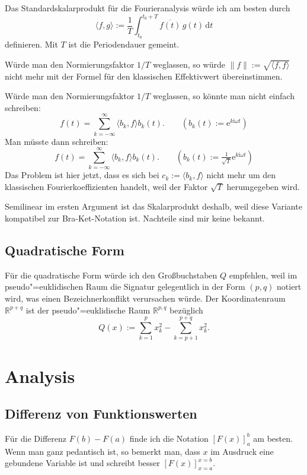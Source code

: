 \documentclass[a4paper,11pt,fleqn,twoside,BCOR=16mm]{scrartcl}
\newcommand{\R}{\mathbb R}
\newcommand{\ee}{\mathrm e}
\newcommand{\ui}{\mathrm i}
\begin{document}
Das Standardskalarprodukt für die Fourieranalysis würde ich
am besten durch
\begin{equation}\label{eq:FourierSP}
\langle f,g\rangle := \frac{1}{T}\int_{t_0}^{t_0+T}
\overline{f(t)}\,g(t)\,\mathrm dt
\end{equation}
definieren. Mit $T$ ist die Periodendauer gemeint.

Würde man den Normierungsfaktor $1/T$ weglassen, so würde
$\|f\|:=\sqrt{\langle f,f\rangle}$ nicht mehr mit der Formel
für den klassischen Effektivwert übereinstimmen.

Würde man den Normierungsfaktor $1/T$ weglassen, so könnte man
nicht einfach schreiben:
\begin{equation}
f(t) = \sum_{k=-\infty}^\infty \langle b_k,f\rangle b_k(t).
\qquad (b_k(t):=\ee^{k\ui \omega t})
\end{equation}
Man müsste dann schreiben:
\begin{equation}
f(t) = \sum_{k=-\infty}^{\infty} \langle b_k,f\rangle b_k(t).
\qquad(b_k(t):=\tfrac{1}{\sqrt{T}}\ee^{k\ui \omega t})
\end{equation}
Das Problem ist hier jetzt, dass es sich bei $c_k:=\langle b_k,f\rangle$
nicht mehr um den klassischen Fourierkoeffizienten handelt, weil
der Faktor $\sqrt{T}$ herumgegeben wird.

Semilinear im ersten Argument ist das Skalarprodukt deshalb, weil
diese Variante kompatibel zur Bra-Ket-Notation ist. Nachteile sind
mir keine bekannt.

\subsection{Quadratische Form}

Für die quadratische Form würde ich den Großbuchstaben $Q$ empfehlen,
weil im pseudo"=euklidischen Raum die Signatur gelegentlich in der
Form $(p,q)$ notiert wird, was einen Bezeichnerkonflikt verursachen
würde. Der Koordinatenraum $\R^{p+q}$ ist der pseudo"=euklidische
Raum $\R^{p,q}$ bezüglich
\begin{equation}
Q(x) := \sum_{k=1}^p x_k^2 - \sum_{k=p+1}^{p+q} x_k^2.
\end{equation}

\section{Analysis}
\subsection{Differenz von Funktionswerten}
Für die Differenz $F(b)-F(a)$ finde ich die Notation $[F(x)]_a^b$
am besten. Wenn man ganz pedantisch ist, so bemerkt man, dass
$x$ im Ausdruck eine gebundene Variable ist und schreibt besser
$[F(x)]_{x=a}^{x=b}$.
\end{document}
